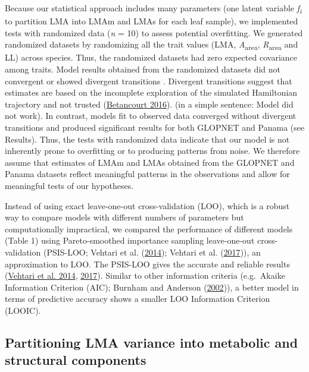 \documentclass[
  12pt,
  a4paper,
,tablecaptionabove
]{scrartcl}
\providecommand{\DIFaddtex}[1]{{\protect\color{blue}\uwave{#1}}} %
\providecommand{\DIFaddbegin}{} %
\providecommand{\DIFaddend}{} %
\providecommand{\DIFadd}[1]{\texorpdfstring{\DIFaddtex{#1}}{#1}} %
\newcommand{\DIFaddincludegraphics}[2][]{{\color{blue}\fbox{\DIFOincludegraphics[#1]{#2}}}} %
\DeclareRobustCommand{\DIFaddbegin}{\DIFOaddbegin \let\includegraphics\DIFaddincludegraphics} %
\DeclareRobustCommand{\DIFaddend}{\DIFOaddend \let\includegraphics\DIFOincludegraphics} %
\begin{document}
Because our statistical approach includes many parameters (one latent
variable \emph{f\textsubscript{i}} to partition LMA into LMAm and LMAs
for each leaf sample), we implemented tests with randomized data
(\emph{n} = 10) to assess potential overfitting. We generated randomized
datasets by randomizing all the trait values (LMA,
\emph{A}\textsubscript{area}, \emph{R}\textsubscript{area} and LL)
across species. Thus, the randomized datasets had zero expected
covariance among traits. Model results obtained from the randomized
datasets did not convergent or showed divergent transitions \DIFaddbegin \DIFadd{(Appendix
S2)}\DIFaddend . Divergent transitions suggest that estimates are based on the
incomplete exploration of the simulated Hamiltonian trajectory and not
trusted (\protect\hyperlink{ref-Betancourt2016}{Betancourt 2016}). (in a
simple sentence: Model did not work). In contrast, models fit to
observed data converged without divergent transitions and produced
significant results for both GLOPNET and Panama (see Results). Thus, the
tests with randomized data indicate that our model is not inherently
prone to overfitting or to producing patterns from noise. We therefore
assume that estimates of LMAm and LMAs obtained from the GLOPNET and
Panama datasets reflect meaningful patterns in the observations and
allow for meaningful tests of our hypotheses.

Instead of using exact leave-one-out cross-validation (LOO), which is a
robust way to compare models with different numbers of parameters but
computationally impractical, we compared the performance of different
models (Table 1) using Pareto-smoothed importance sampling leave-one-out
cross-validation (PSIS-LOO; Vehtari et al.
(\protect\hyperlink{ref-Vehtari2014}{2014}); Vehtari et al.
(\protect\hyperlink{ref-Vehtari2017}{2017})), an approximation to LOO.
The PSIS-LOO gives the accurate and reliable results
(\protect\hyperlink{ref-Vehtari2014}{Vehtari et al. 2014},
\protect\hyperlink{ref-Vehtari2017}{2017}). Similar to other information
criteria (e.g.~Akaike Information Criterion (AIC); Burnham and Anderson
(\protect\hyperlink{ref-Burnham2002}{2002})), a better model in terms of
predictive accuracy shows a smaller LOO Information Criterion (LOOIC).

\hypertarget{partitioning-lma-variance-into-metabolic-and-structural-components}{%
\subsection{Partitioning LMA variance into metabolic and structural
components}\label{partitioning-lma-variance-into-metabolic-and-structural-components}}
\end{document}
